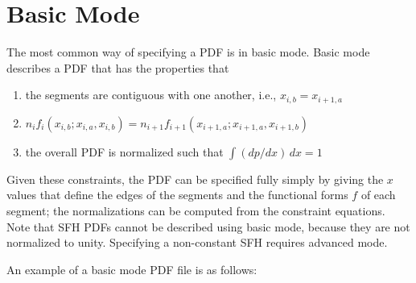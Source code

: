 \documentclass[letterpaper,10pt,english]{sphinxmanual}
\begin{document}
\section{Basic Mode}
\label{\detokenize{pdfs:basic-mode}}
The most common way of specifying a PDF is in basic mode. Basic mode describes a PDF that has the properties that
\begin{enumerate}
\item {} 
the segments are contiguous with one another, i.e., \(x_{i,b} = x_{i+1,a}\)

\item {} 
\(n_i f_i(x_{i,b}; x_{i,a}, x_{i,b}) = n_{i+1} f_{i+1}(x_{i+1,a}; x_{i+1,a}, x_{i+1,b})\)

\item {} 
the overall PDF is normalized such that \(\int (dp/dx)\, dx = 1\)

\end{enumerate}

Given these constraints, the PDF can be specified fully simply by giving the \(x\) values that define the edges of the segments and the functional forms \(f\) of each segment; the normalizations can be computed from the constraint equations. Note that SFH PDFs cannot be described using basic mode, because they are not normalized to unity. Specifying a non-constant SFH requires advanced mode.

An example of a basic mode PDF file is as follows:
\end{document}
